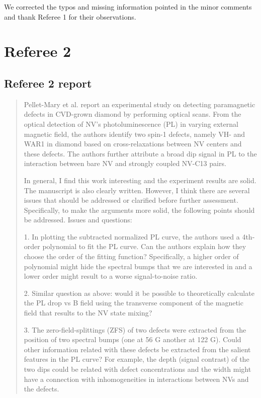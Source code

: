 \documentclass{article}
\begin{document}
We corrected the typos and missing information pointed in the minor comments and thank Referee 1 for their observations.

\section*{Referee 2}
\subsection*{Referee 2 report}
\begin{quote}
Pellet-Mary et al. report an experimental study on detecting paramagnetic defects in CVD-grown diamond by performing optical scans. From the optical detection of NV’s photoluminescence (PL) in varying external magnetic field, the authors identify two spin-1 defects, namely VH- and WAR1 in diamond based on cross-relaxations between NV centers and these defects. The authors further attribute a broad dip signal in PL to the interaction between bare NV and strongly coupled NV-C13 pairs.

In general, I find this work interesting and the experiment results are solid. The manuscript is also clearly written. However, I think there are several issues that should be addressed or clarified before further assessment. Specifically, to make the arguments more solid, the following points should be addressed.
Issues and questions:

1. In plotting the subtracted normalized PL curve, the authors used a 4th-order polynomial to fit the PL curve. Can the authors explain how they choose the order of the fitting function? Specifically, a higher order of polynomial might hide the spectral bumps that we are interested in and a lower order might result to a worse signal-to-noise ratio.

2. Similar question as above: would it be possible to theoretically calculate the PL drop vs B field using the transverse component of the magnetic field that results to the NV state mixing?

3. The zero-field-splittings (ZFS) of two defects were extracted from the position of two spectral bumps (one at 56 G another at 122 G). Could other information related with these defects be extracted from the salient features in the PL curve? For example, the depth (signal contrast) of the two dips could be related with defect concentrations and the width might have a connection with inhomogeneities in interactions between NVs and the defects.


\end{quote}
\end{document}
